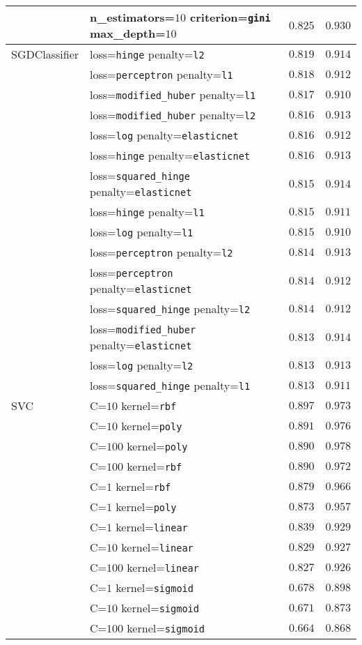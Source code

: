 \begin{longtable}{llrr}
& \tiny{n\_estimators=$10$ criterion=\texttt{gini} max\_depth=$10$} &$0.825$ & $0.930$\\
\midrule
SGDClassifier & \tiny{loss=\texttt{hinge} penalty=\texttt{l2}} &$0.819$ & $0.914$\\
& \tiny{loss=\texttt{perceptron} penalty=\texttt{l1}} &$0.818$ & $0.912$\\
& \tiny{loss=\texttt{modified\_huber} penalty=\texttt{l1}} &$0.817$ & $0.910$\\
& \tiny{loss=\texttt{modified\_huber} penalty=\texttt{l2}} &$0.816$ & $0.913$\\
& \tiny{loss=\texttt{log} penalty=\texttt{elasticnet}} &$0.816$ & $0.912$\\
& \tiny{loss=\texttt{hinge} penalty=\texttt{elasticnet}} &$0.816$ & $0.913$\\
& \tiny{loss=\texttt{squared\_hinge} penalty=\texttt{elasticnet}} &$0.815$ & $0.914$\\
& \tiny{loss=\texttt{hinge} penalty=\texttt{l1}} &$0.815$ & $0.911$\\
& \tiny{loss=\texttt{log} penalty=\texttt{l1}} &$0.815$ & $0.910$\\
& \tiny{loss=\texttt{perceptron} penalty=\texttt{l2}} &$0.814$ & $0.913$\\
& \tiny{loss=\texttt{perceptron} penalty=\texttt{elasticnet}} &$0.814$ & $0.912$\\
& \tiny{loss=\texttt{squared\_hinge} penalty=\texttt{l2}} &$0.814$ & $0.912$\\
& \tiny{loss=\texttt{modified\_huber} penalty=\texttt{elasticnet}} &$0.813$ & $0.914$\\
& \tiny{loss=\texttt{log} penalty=\texttt{l2}} &$0.813$ & $0.913$\\
& \tiny{loss=\texttt{squared\_hinge} penalty=\texttt{l1}} &$0.813$ & $0.911$\\
\midrule
SVC & \tiny{C=$10$ kernel=\texttt{rbf}} &$0.897$ & $0.973$\\
& \tiny{C=$10$ kernel=\texttt{poly}} &$0.891$ & $0.976$\\
& \tiny{C=$100$ kernel=\texttt{poly}} &$0.890$ & $0.978$\\
& \tiny{C=$100$ kernel=\texttt{rbf}} &$0.890$ & $0.972$\\
& \tiny{C=$1$ kernel=\texttt{rbf}} &$0.879$ & $0.966$\\
& \tiny{C=$1$ kernel=\texttt{poly}} &$0.873$ & $0.957$\\
& \tiny{C=$1$ kernel=\texttt{linear}} &$0.839$ & $0.929$\\
& \tiny{C=$10$ kernel=\texttt{linear}} &$0.829$ & $0.927$\\
& \tiny{C=$100$ kernel=\texttt{linear}} &$0.827$ & $0.926$\\
& \tiny{C=$1$ kernel=\texttt{sigmoid}} &$0.678$ & $0.898$\\
& \tiny{C=$10$ kernel=\texttt{sigmoid}} &$0.671$ & $0.873$\\
& \tiny{C=$100$ kernel=\texttt{sigmoid}} &$0.664$ & $0.868$\\
\end{longtable}
